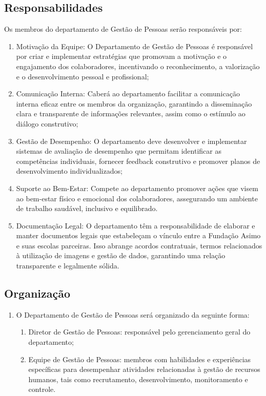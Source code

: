         \subsection{Responsabilidades}
            Os membros do departamento de Gestão de Pessoas serão responsáveis por:
            \begin{enumerate}
                \item Motivação da Equipe: O Departamento de Gestão de Pessoas é responsável por criar e implementar estratégias que promovam a motivação e o engajamento dos colaboradores, incentivando o reconhecimento, a valorização e o desenvolvimento pessoal e profissional;
                \item Comunicação Interna: Caberá ao departamento facilitar a comunicação interna eficaz entre os membros da organização, garantindo a disseminação clara e transparente de informações relevantes, assim como o estímulo ao diálogo construtivo;
                \item Gestão de Desempenho: O departamento deve desenvolver e implementar sistemas de avaliação de desempenho que permitam identificar as competências individuais, fornecer feedback construtivo e promover planos de desenvolvimento individualizados;
                \item  Suporte ao Bem-Estar: Compete ao departamento promover ações que visem ao bem-estar físico e emocional dos colaboradores, assegurando um ambiente de trabalho saudável, inclusivo e equilibrado.
                \item Documentação Legal: O departamento têm a responsabilidade de elaborar e manter documentos legais que estabeleçam o vínculo entre a Fundação Asimo e suas escolas parceiras. Isso abrange acordos contratuais, termos relacionados à utilização de imagens e gestão de dados, garantindo uma relação transparente e legalmente sólida.
            \end{enumerate}
        
        \subsection{Organização}
        \begin{enumerate}
            \item O Departamento de Gestão de Pessoas será organizado da seguinte forma:
                \begin{enumerate}
                    \item Diretor de Gestão de Pessoas: responsável pelo gerenciamento geral do departamento;
                    \item Equipe de Gestão de Pessoas: membros com habilidades e experiências específicas para desempenhar atividades relacionadas à gestão de recursos humanos, tais como recrutamento, desenvolvimento, monitoramento e controle.
                \end{enumerate}
        \end{enumerate}
        
